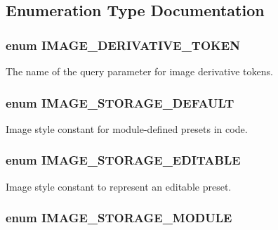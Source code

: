\subsection{Enumeration Type Documentation}
\hypertarget{image_8module_a8a6f7ae8bb3763bbb2a257f43d110493}{
\subsubsection[{IMAGE\_\-DERIVATIVE\_\-TOKEN}]{\setlength{\rightskip}{0pt plus 5cm}enum {\bf IMAGE\_\-DERIVATIVE\_\-TOKEN}}}
\label{image_8module_a8a6f7ae8bb3763bbb2a257f43d110493}
The name of the query parameter for image derivative tokens. \hypertarget{image_8module_a2d98c7ee570daf265a73daaf0146e7b6}{
\subsubsection[{IMAGE\_\-STORAGE\_\-DEFAULT}]{\setlength{\rightskip}{0pt plus 5cm}enum {\bf IMAGE\_\-STORAGE\_\-DEFAULT}}}
\label{image_8module_a2d98c7ee570daf265a73daaf0146e7b6}
Image style constant for module-\/defined presets in code. \hypertarget{image_8module_a09997555da59d60fccb6435974c29003}{
\subsubsection[{IMAGE\_\-STORAGE\_\-EDITABLE}]{\setlength{\rightskip}{0pt plus 5cm}enum {\bf IMAGE\_\-STORAGE\_\-EDITABLE}}}
\label{image_8module_a09997555da59d60fccb6435974c29003}
Image style constant to represent an editable preset. \hypertarget{image_8module_a5eeb2eba5576aacf25051422d667de24}{
\subsubsection[{IMAGE\_\-STORAGE\_\-MODULE}]{\setlength{\rightskip}{0pt plus 5cm}enum {\bf IMAGE\_\-STORAGE\_\-MODULE}}}
